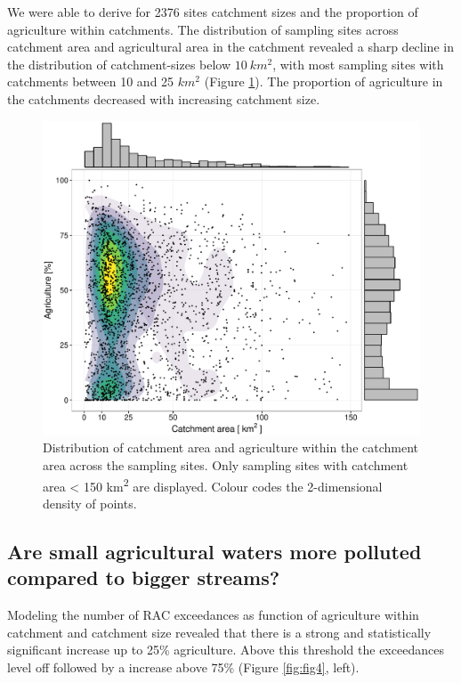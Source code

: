 \documentclass[journal=esthag,manuscript=article]{achemso}
\begin{document}
We were able to derive for 2376 sites catchment sizes and the proportion of agriculture within catchments. 
%
%
The distribution of sampling sites across catchment area and agricultural area in the catchment revealed a sharp decline in the distribution of catchment-sizes below $10~km^2$, with most sampling sites with catchments between 10 and 25 $km^2$ (Figure \ref{fig:fig3}).
The proportion of agriculture in the catchments decreased with increasing catchment size.

\begin{figure}[ht]
  \includegraphics[width=.8\textwidth]{figure3.pdf}
  \caption{Distribution of catchment area and agriculture within the catchment area across the sampling sites.
  Only sampling sites with catchment area < 150 km\textsuperscript{2} are displayed. 
  Colour codes the 2-dimensional density of points.
  }
  \label{fig:fig3}
\end{figure}



\subsection{Are small agricultural waters more polluted compared to bigger streams?}

Modeling the number of RAC exceedances as function of agriculture within catchment and catchment size revealed that there is a strong and statistically significant increase up to 25\% agriculture.
Above this threshold the exceedances level off followed by a increase above 75\% (Figure \ref{fig:fig4}, left).
\end{document}
